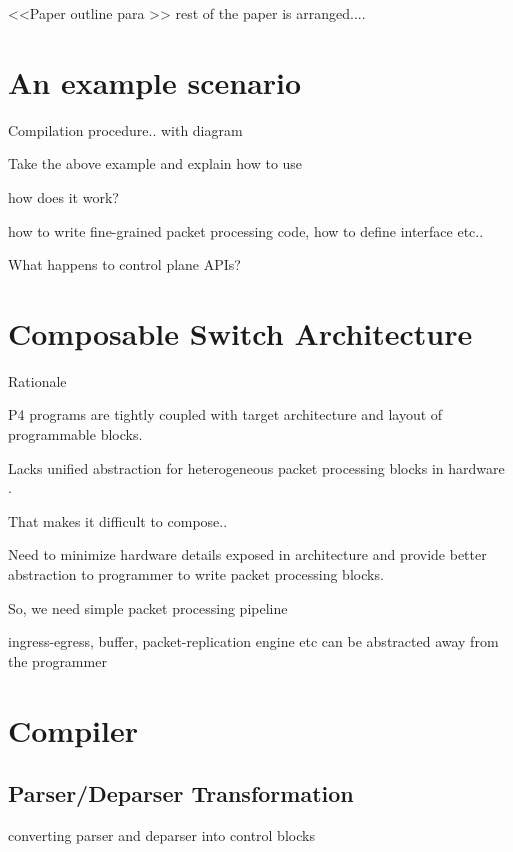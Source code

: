 \documentclass[10pt,sigconf,letterpaper,anonymous]{acmart}
\begin{document}
%  
% 
%  
%  
%  

<<Paper outline para  >> rest of the paper is arranged....


\section{An example scenario}

Compilation procedure.. with diagram

Take the above example and explain how to use

how does it work?

how to write fine-grained packet processing code, how to define interface etc..

What happens to control plane APIs?

\section{Composable Switch Architecture}

Rationale

P4 programs are tightly coupled with target architecture and layout of programmable blocks.

Lacks unified abstraction for heterogeneous packet processing blocks in hardware  .

That makes it difficult to compose..

Need to minimize hardware details exposed in architecture and provide better abstraction to programmer to write packet processing blocks.

So, we need simple packet processing pipeline

ingress-egress, buffer, packet-replication engine etc can be abstracted away from the programmer


\section{Compiler}

\subsection{Parser/Deparser Transformation}
converting parser and deparser into control blocks
\end{document}
